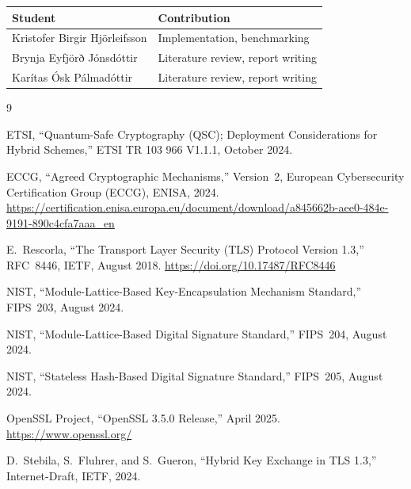 \documentclass[11pt,a4paper]{article}
\begin{document}
\begin{tabular}{ll}
\toprule
Student & Contribution \\
\midrule
Kristofer Birgir Hjörleifsson & Implementation, benchmarking \\
Brynja Eyfjörð Jónsdóttir & Literature review, report writing \\
Karítas Ósk Pálmadóttir & Literature review, report writing \\
\bottomrule
\end{tabular}

\begin{thebibliography}{9}

ETSI, ``Quantum-Safe Cryptography (QSC); Deployment Considerations for Hybrid Schemes,''
ETSI TR 103 966 V1.1.1, October 2024.

ECCG, ``Agreed Cryptographic Mechanisms,'' Version~2, European Cybersecurity Certification Group (ECCG), ENISA, 2024.
\url{https://certification.enisa.europa.eu/document/download/a845662b-aee0-484e-9191-890c4cfa7aaa_en}

E.~Rescorla, ``The Transport Layer Security (TLS) Protocol Version 1.3,''
RFC~8446, IETF, August 2018.
\url{https://doi.org/10.17487/RFC8446}

NIST, ``Module-Lattice-Based Key-Encapsulation Mechanism Standard,''
FIPS~203, August 2024.

NIST, ``Module-Lattice-Based Digital Signature Standard,''
FIPS~204, August 2024.

NIST, ``Stateless Hash-Based Digital Signature Standard,''
FIPS~205, August 2024.

OpenSSL Project, ``OpenSSL 3.5.0 Release,'' April 2025.
\url{https://www.openssl.org/}

D.~Stebila, S.~Fluhrer, and S.~Gueron, ``Hybrid Key Exchange in TLS 1.3,''
Internet-Draft, IETF, 2024.

\end{thebibliography}
\end{document}
